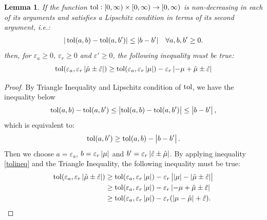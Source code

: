 \documentclass{iitthesis}
\newtheorem{lemma}[theorem]{Lemma}
\begin{document}
\begin{lemma}\label{cost1}
If the function $\operatorname{tol}: [0, \infty) \times [0, \infty) \to [0,\infty)$ is non-decreasing in each of its arguments and satisfies a Lipschitz condition in terms of its second argument, i.e.:
\begin{align}
|\operatorname{tol} (a,b)-\operatorname{tol} (a,b')| \leq |b-b'| \quad \forall a,b,b' \geq 0.
\end{align}
then, for $\varepsilon_a \geq 0$, $\varepsilon_r\geq 0$ and $\varepsilon' \geq 0$, the following inequality must be true:
$$\operatorname{tol} (\varepsilon_a, \varepsilon_r \left \lvert \hat{\mu} \pm\hat{\varepsilon}  \right \rvert) \geq \operatorname{tol}(\varepsilon_a,\varepsilon_r \left \lvert \mu \right \rvert)-\varepsilon_r \left \lvert -\mu+\hat{\mu} \pm\hat{\varepsilon} \right \rvert$$
\end{lemma}
\begin{proof}
By Triangle Inequality and Lipschitz condition of $\operatorname{tol}$, we have the inequality below
 $$\operatorname{tol}(a,b) -\operatorname{tol}(a,b') \leq \left \lvert \operatorname{tol}(a,b) -\operatorname{tol}(a,b') \right \rvert \leq \left \lvert b-b' \right \rvert,$$
which is equivalent to:
\begin{align}\label{tolineq}
\operatorname{tol}(a,b') \geq \operatorname{tol}(a,b)-\left \lvert b-b' \right \rvert.
\end{align}
Then we choose $a = \varepsilon_a$, $b =\varepsilon_r\left \lvert \mu \right \rvert$ and $b'=\varepsilon_r\left \lvert \hat{\varepsilon} \pm \hat{\mu} \right \rvert$. By applying inequality \eqref{tolineq} and the Triangle Inequality, the following inequality must be true:
\begin{align}
\operatorname{tol} (\varepsilon_a, \varepsilon_r \left \lvert \hat{\mu} \pm\hat{\varepsilon} \right \rvert) &
 \geq \operatorname{tol}(\varepsilon_a,\varepsilon_r \left \lvert \mu \right \rvert)-\varepsilon_r \left \lvert \left \lvert \mu \right \rvert-\left \lvert \hat{\mu}  \pm \hat{\varepsilon} \right \rvert \right \rvert \\&\geq \operatorname{tol}(\varepsilon_a,\varepsilon_r \left \lvert \mu \right \rvert)-\varepsilon_r \left \lvert -\mu+\hat{\mu} \pm \hat{\varepsilon} \right \rvert \\&
 \geq \operatorname{tol}(\varepsilon_a,\varepsilon_r \left \lvert \mu \right \rvert)-\varepsilon_r (\left \lvert \mu-\hat{\mu} \right \rvert + \hat{\varepsilon}).
  \label{lipstol}
\end{align}
\end{proof}
\end{document}
